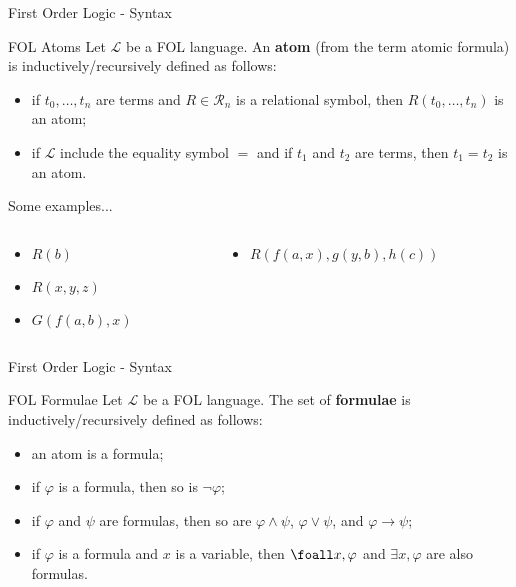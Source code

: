 \documentclass[aspectratio=169]{beamer}
\begin{document}
\begin{slide}{First Order Logic - Syntax}
  \begin{block}{FOL Atoms}  
  Let $\mathcal{L}$ be a FOL language. An {\bf atom} (from the term atomic formula) is inductively/recursively defined as follows:
  \begin{itemize}
  \item if $t_0,\ldots,t_n$ are terms and $R \in \mathcal{R}_n$ is a relational symbol, then $R(t_0,\ldots,t_n)$ is an atom;
  \item if $\mathcal{L}$ include the equality symbol $=$ and if $t_1$ and $t_2$ are terms, then $t_1 = t_2$ is an atom.  
  \end{itemize}
  \end{block}
  
  \begin{block}{Some examples...}
  \begin{columns}
    \begin{column}{0.48\textwidth}
      \begin{itemize}
        \item $R(b)$
        \item $R(x,y,z)$
        \item $G(f(a,b),x)$
      \end{itemize}
    \end{column}
    \begin{column}{0.48\textwidth}
      \begin{itemize}
        \item $R(f(a,x),g(y,b),h(c))$
      \end{itemize}        
    \end{column}
  \end{columns}
  \end{block}

\end{slide}

\begin{slide}{First Order Logic - Syntax}
  \begin{block}{FOL Formulae}  
  Let $\mathcal{L}$ be a FOL language. The set of {\bf formulae} is inductively/recursively defined  as follows:
  \begin{itemize}
  \item an atom is a formula;
  \item if $\varphi$ is a formula, then so is $\neg\varphi$;
  \item if $\varphi$ and $\psi$ are formulas, then so are $\varphi \land \psi$, $\varphi \lor \psi$, and $\varphi \to \psi$;
  \item if $\varphi$ is a formula and $x$ is a variable, then $\foall x, \varphi$ and $\exists x, \varphi$ are also formulas.
  \end{itemize}
  \end{block}
\end{slide}
\end{document}
